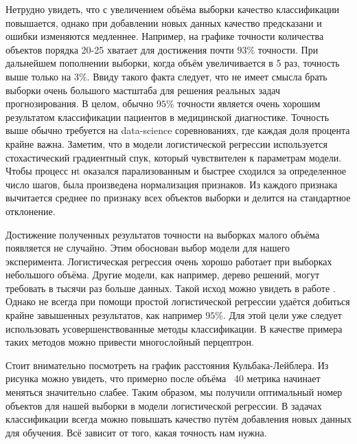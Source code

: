 \documentclass[12pt,twoside]{article}
\begin{document}
Нетрудно увидеть, что с увеличением объёма выборки качество классификации повышается, однако при добавлении новых данных качество предсказани и ошибки изменяются медленнее. Например, на графике точности количества объектов порядка 20-25 хватает для достижения почти $93\%$ точности. При дальнейшем пополнении выборки, когда объём увеличивается в 5 раз, точность выше только на $3\%$. Ввиду такого факта следует, что не имеет смысла брать выборки очень большого мастштаба для решения реальных задач прогнозирования. В целом, обычно $95\%$ точности является очень хорошим результатом классификации пациентов в медицинской диагностике. Точность выше обычно требуется на data-science соревнованиях, где каждая доля процента крайне важна. Заметим, что в модели логистической регрессии используется стохастический градиентный спук, который чувствителен к параметрам модели. Чтобы процесс нt оказался парализованным и быстрее сходился за определенное число шагов, была произведена нормализация признаков. Из каждого признака вычитается среднее по признаку всех объектов выборки и делится на стандартное отклонение.

Достижение полученных результатов точности на выборках малого объёма появляется не случайно. Этим обоснован выбор модели для нашего эксперимента. Логистическая регрессия очень хорошо работает при выборках небольшого объёма. Другие модели, как например, дерево решений, могут требовать в тысячи раз больше данных. Такой исход можно увидеть в работе \cite{smpltr}. Однако не всегда при помощи простой логистической регрессии удаётся добиться крайне завышенных результатов, как например $95\%$. Для этой цели уже следует использовать усовершенствованные методы классификации. В качестве примера таких методов можно привести многослойный перцептрон.
  

\begin{figure}[h]
	\centering
	\label{fg:kl}
\end{figure}

Стоит внимательно посмотреть на график расстояния Кульбака-Лейблера. Из рисунка можно увидеть, что примерно после объёма ~40 метрика начинает меняться значительно слабее. Таким образом, мы получили оптимальный номер объектов для нашей выборки в модели логистической регрессии.
В задачах классификации всегда можно повышать качество путём добавления новых данных для обучения. Всё зависит от того, какая точность нам нужна. 
\end{document}
